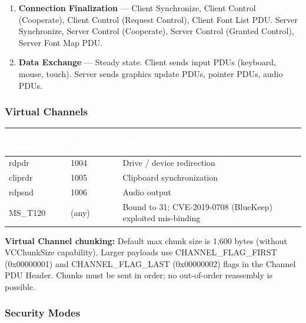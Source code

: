 \documentclass[11pt,letterpaper]{article}
\newcommand{\tableheader}[1]{\textbf{\sffamily\textcolor{white}{#1}}}
\begin{document}
\begin{enumerate}[leftmargin=*, label=\textbf{Phase \arabic*.}]
\item \textbf{Connection Finalization} --- Client Synchronize, Client Control (Cooperate), Client Control (Request Control), Client Font List PDU. Server Synchronize, Server Control (Cooperate), Server Control (Granted Control), Server Font Map PDU.

\item \textbf{Data Exchange} --- Steady state. Client sends input PDUs (keyboard, mouse, touch). Server sends graphics update PDUs, pointer PDUs, audio PDUs.
\end{enumerate}

\subsubsection{Virtual Channels}

\begin{center}
\begin{tabularx}{\textwidth}{L{2.5cm}L{3cm}X}
\toprule
{}
\tableheader{Channel Name} & \tableheader{Channel ID} & \tableheader{Function} \\
\midrule
rdpdr & 1004 & Drive / device redirection \\
cliprdr & 1005 & Clipboard synchronization \\
rdpsnd & 1006 & Audio output \\
MS\_T120 & (any) & Bound to 31; CVE-2019-0708 (BlueKeep) exploited mis-binding \\
\bottomrule
\end{tabularx}
\end{center}

\textbf{Virtual Channel chunking:} Default max chunk size is 1,600 bytes (without VCChunkSize capability). Larger payloads use CHANNEL\_FLAG\_FIRST (0x00000001) and CHANNEL\_FLAG\_LAST (0x00000002) flags in the Channel PDU Header. Chunks must be sent in order; no out-of-order reassembly is possible.

\subsubsection{Security Modes}
\end{document}
